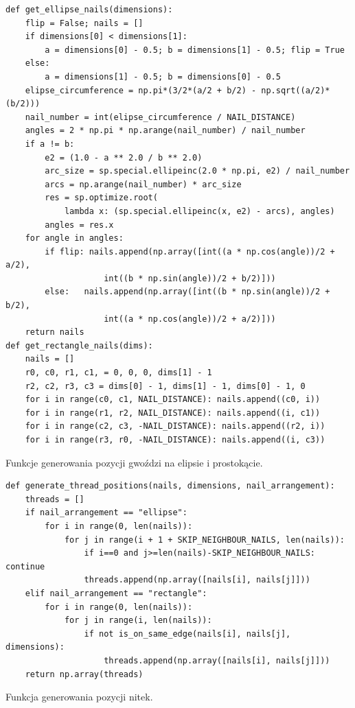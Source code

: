         \begin{code}[H]
        \begin{verbatim}
def get_ellipse_nails(dimensions):
    flip = False; nails = []
    if dimensions[0] < dimensions[1]:
        a = dimensions[0] - 0.5; b = dimensions[1] - 0.5; flip = True
    else:
        a = dimensions[1] - 0.5; b = dimensions[0] - 0.5
    elipse_circumference = np.pi*(3/2*(a/2 + b/2) - np.sqrt((a/2)*(b/2)))
    nail_number = int(elipse_circumference / NAIL_DISTANCE)
    angles = 2 * np.pi * np.arange(nail_number) / nail_number
    if a != b:
        e2 = (1.0 - a ** 2.0 / b ** 2.0)
        arc_size = sp.special.ellipeinc(2.0 * np.pi, e2) / nail_number
        arcs = np.arange(nail_number) * arc_size
        res = sp.optimize.root(
            lambda x: (sp.special.ellipeinc(x, e2) - arcs), angles)
        angles = res.x 
    for angle in angles:
        if flip: nails.append(np.array([int((a * np.cos(angle))/2 + a/2), 
                    int((b * np.sin(angle))/2 + b/2)]))
        else:   nails.append(np.array([int((b * np.sin(angle))/2 + b/2), 
                    int((a * np.cos(angle))/2 + a/2)]))
    return nails
def get_rectangle_nails(dims):
    nails = []
    r0, c0, r1, c1, = 0, 0, 0, dims[1] - 1
    r2, c2, r3, c3 = dims[0] - 1, dims[1] - 1, dims[0] - 1, 0
    for i in range(c0, c1, NAIL_DISTANCE): nails.append((c0, i))
    for i in range(r1, r2, NAIL_DISTANCE): nails.append((i, c1))
    for i in range(c2, c3, -NAIL_DISTANCE): nails.append((r2, i))
    for i in range(r3, r0, -NAIL_DISTANCE): nails.append((i, c3))
        \end{verbatim}
        \caption{Funkcje generowania pozycji gwoździ na elipsie i prostokącie.}
        \label{imp-dict-nails-elipse-rectange-code}
        \end{code}
        
        \begin{code}[H]
        \begin{verbatim}
def generate_thread_positions(nails, dimensions, nail_arrangement):
    threads = []
    if nail_arrangement == "ellipse":
        for i in range(0, len(nails)):
            for j in range(i + 1 + SKIP_NEIGHBOUR_NAILS, len(nails)):
                if i==0 and j>=len(nails)-SKIP_NEIGHBOUR_NAILS: continue
                threads.append(np.array([nails[i], nails[j]]))
    elif nail_arrangement == "rectangle":
        for i in range(0, len(nails)):
            for j in range(i, len(nails)):
                if not is_on_same_edge(nails[i], nails[j], dimensions):
                    threads.append(np.array([nails[i], nails[j]]))
    return np.array(threads)
        \end{verbatim}
        \caption{Funkcja generowania pozycji nitek.}
        \label{imp-dict-threads-code}
        \end{code}
        

